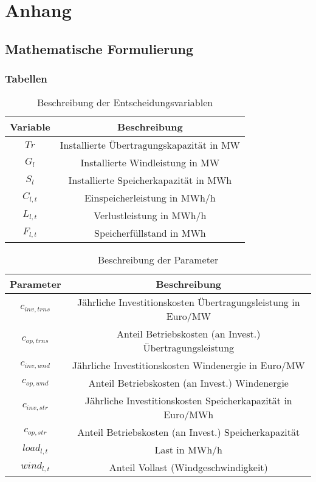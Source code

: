 \newpage
\section{Anhang} \label{str:anhang}

\subsection{Mathematische Formulierung}
\subsubsection*{Tabellen} 
\begin{table}[htbp]
\caption{Beschreibung der Entscheidungsvariablen}
\begin{center}
\begin{tabular}{c|c} 
Variable & Beschreibung \\
\hline \hline
$Tr$ & Installierte Übertragungskapazität in MW \\
\hline
$G_{l}$ & Installierte Windleistung in MW \\
\hline
$S_{l}$ & Installierte Speicherkapazität in MWh \\
\hline
$C_{l, t}$ & Einspeicherleistung in MWh/h \\
\hline
$L_{l, t}$ & Verlustleistung in MWh/h \\
\hline
$F_{l, t}$ & Speicherfüllstand in MWh \\

\end{tabular} 
\end{center}
\label{tab:variablen}
\end{table}

\begin{table}[htbp]
\caption{Beschreibung der Parameter}
\begin{center}
\begin{tabular}{c|c} 
Parameter & Beschreibung \\
\hline \hline
$c_{inv, trns}$ & Jährliche Investitionskosten Übertragungsleistung in Euro/MW \\
\hline
$c_{op, trns}$ & Anteil Betriebskosten (an Invest.) Übertragungsleistung\\
\hline
$c_{inv, wnd}$ & Jährliche Investitionskosten Windenergie in Euro/MW \\
\hline
$c_{op, wnd}$ & Anteil Betriebskosten (an Invest.) Windenergie\\
\hline
$c_{inv, str}$ & Jährliche Investitionskosten Speicherkapazität in Euro/MWh \\
\hline
$c_{op, str}$ & Anteil Betriebskosten (an Invest.) Speicherkapazität\\
\hline
$load_{l, t}$ & Last in MWh/h\\
\hline
$wind_{l, t}$ & Anteil Vollast (Windgeschwindigkeit) \\

\end{tabular} 
\end{center}
\label{tab:parameter}
\end{table}

